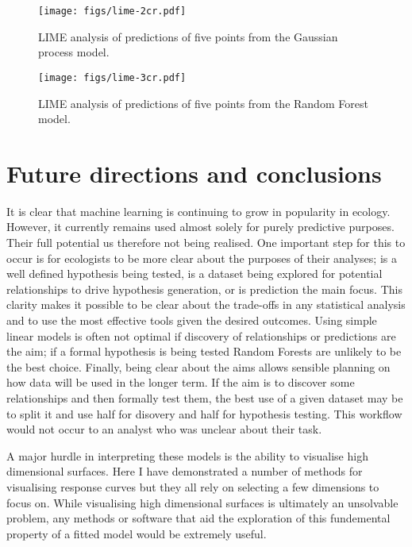 \documentclass[10pt,]{article}
\begin{document}
\begin{figure}[t!]
\centering
\texttt{[image: figs/lime-2cr.pdf]}
\caption{LIME analysis of predictions of five points from the Gaussian process model.\protect\label{fig:limegp}}
\end{figure}

\begin{figure}[t!]
\centering
\texttt{[image: figs/lime-3cr.pdf]}
\caption{LIME analysis of predictions of five points from the Random Forest model.\protect\label{fig:limerf}}
\end{figure}

\section{Future directions and conclusions}\label{future-directions-and-conclusions}

It is clear that machine learning is continuing to grow in popularity in ecology. However, it currently remains used almost solely for purely predictive purposes. Their full potential us therefore not being realised. One important step for this to occur is for ecologists to be more clear about the purposes of their analyses; is a well defined hypothesis being tested, is a dataset being explored for potential relationships to drive hypothesis generation, or is prediction the main focus. This clarity makes it possible to be clear about the trade-offs in any statistical analysis and to use the most effective tools given the desired outcomes. Using simple linear models is often not optimal if discovery of relationships or predictions are the aim; if a formal hypothesis is being tested Random Forests are unlikely to be the best choice. Finally, being clear about the aims allows sensible planning on how data will be used in the longer term. If the aim is to discover some relationships and then formally test them, the best use of a given dataset may be to split it and use half for disovery and half for hypothesis testing. This workflow would not occur to an analyst who was unclear about their task.

A major hurdle in interpreting these models is the ability to visualise high dimensional surfaces. Here I have demonstrated a number of methods for visualising response curves but they all rely on selecting a few dimensions to focus on. While visualising high dimensional surfaces is ultimately an unsolvable problem, any methods or software that aid the exploration of this fundemental property of a fitted model would be extremely useful.
\end{document}
